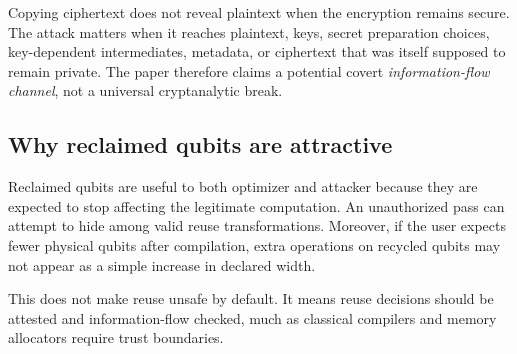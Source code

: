 \begin{cautionbox}
Copying ciphertext does not reveal plaintext when the encryption remains
secure. The attack matters when it reaches plaintext, keys, secret preparation
choices, key-dependent intermediates, metadata, or ciphertext that was itself
supposed to remain private. The paper therefore claims a potential covert
\emph{information-flow channel}, not a universal cryptanalytic break.
\end{cautionbox}

\subsection{Why reclaimed qubits are attractive}

Reclaimed qubits are useful to both optimizer and attacker because they are
expected to stop affecting the legitimate computation. An unauthorized pass can
attempt to hide among valid reuse transformations. Moreover, if the user expects
fewer physical qubits after compilation, extra operations on recycled qubits may
not appear as a simple increase in declared width.

This does not make reuse unsafe by default. It means reuse decisions should be
attested and information-flow checked, much as classical compilers and memory
allocators require trust boundaries.
